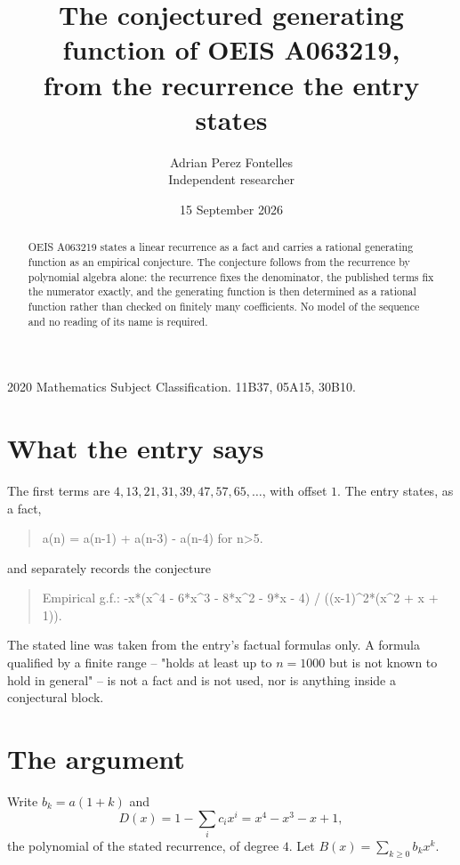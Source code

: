 \documentclass[11pt,a4paper]{article}
\title{The conjectured generating function of OEIS A063219,\\ \large from the recurrence the entry
states}
\author{Adrian Perez Fontelles\\ \small Independent researcher}
\date{15 September 2026}
\theoremstyle{plain}
\theoremstyle{definition}
\begin{document}
\maketitle

\begin{abstract}
OEIS A063219 states a linear recurrence as a fact and carries a rational generating function as an
empirical conjecture. The conjecture follows from the recurrence by polynomial algebra alone:
the recurrence fixes the denominator, the published terms fix the numerator exactly, and the
generating function is then determined as a rational function rather than checked on finitely
many coefficients. No model of the sequence and no reading of its name is required.
\end{abstract}

\noindent\small 2020 Mathematics Subject Classification. 11B37, 05A15, 30B10.\normalsize

\section{What the entry says}

The first terms are $4, 13, 21, 31, 39, 47, 57, 65,\dots$, with offset $1$. The entry states, as a fact,

\begin{quote}\raggedright a(n) = a(n-1) + a(n-3) - a(n-4) for n>5.\end{quote}

\noindent and separately records the conjecture

\begin{quote}\raggedright Empirical g.f.: -x*(x\^{}4 - 6*x\^{}3 - 8*x\^{}2 - 9*x - 4) / ((x-1)\^{}2*(x\^{}2 + x + 1)).\end{quote}

The stated line was taken from the entry's factual formulas only. A formula qualified by a
finite range -- "holds at least up to $n=1000$ but is not known to hold in general" -- is not a
fact and is not used, nor is anything inside a conjectural block.

\section{The argument}

Write $b_k=a(1+k)$ and
\[
  D(x)=1-\sum_{i} c_i x^{i}=x^{4} - x^{3} - x + 1 ,
\]
the polynomial of the stated recurrence, of degree $4$. Let $B(x)=\sum_{k\ge0}b_kx^k$.
\end{document}
